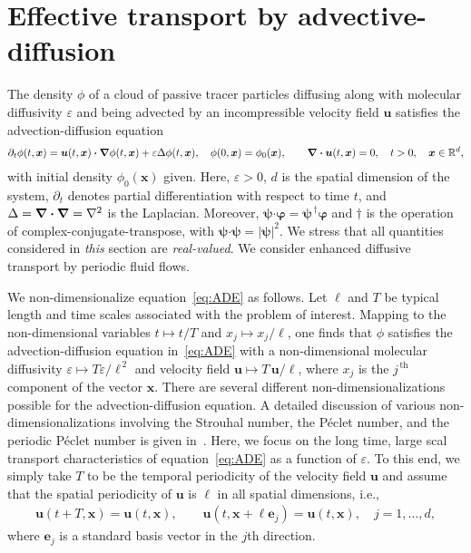 \documentclass[leqno,onefignum,onetabnum]{siamltex1213}
\newcommand\bnabla{\mbox{\boldmath${\nabla}$}}
\providecommand\bcdot{\boldsymbol{\cdot}}
\newcommand{\vecx}{\boldsymbol{x}}
\newcommand{\vecu}{\boldsymbol{u}}
\newcommand{\vece}{\boldsymbol{e}}
\newcommand{\vecpsi}{\boldsymbol{\psi}}
\newcommand{\vecvarphi}{\boldsymbol{\varphi}}
\begin{document}
\section{Effective transport by
  advective-diffusion} \label{sec:Eff_Trans}    
%
The density $\phi$ of a cloud of passive tracer particles diffusing along
with molecular diffusivity $\varepsilon$ and being advected by an incompressible
velocity field $\vecu$ satisfies the advection-diffusion equation
%
\begin{align}\label{eq:ADE}
  \partial_t\phi(t,\vecx)
    =\vecu (t,\vecx)\bcdot\bnabla \phi(t,\vecx)+\varepsilon\Delta \phi(t,\vecx),
  \quad
  \phi(0,\vecx)=\phi_0(\vecx),
  \qquad
  \bnabla \bcdot\vecu(t,\vecx) =0,
  \quad
  t>0,
  \quad
  \vecx\in\mathbb{R}^d,
\end{align}
%
with initial density $\phi_0(\vecx)$ given. Here, $\varepsilon>0$, $d$ is the
spatial dimension of the system, 
$\partial_t$ denotes partial differentiation with respect to time $t$, and 
$\Delta=\bnabla\bcdot\bnabla =\nabla^2$ is the Laplacian. Moreover,
$\vecpsi\bcdot\vecvarphi=\vecpsi^{\,\dagger}\vecvarphi$ and $\dagger$ is the operation
of complex-conjugate-transpose, with
$\vecpsi\bcdot\vecpsi=|\vecpsi|^2$. We stress that all quantities 
considered in \emph{this} section are \emph{real-valued}. We
consider enhanced diffusive transport by periodic fluid flows.




 
We non-dimensionalize equation~\eqref{eq:ADE} as follows. Let $\ell$ and
$T$ be typical length and time scales associated with the problem of
interest. Mapping to the non-dimensional variables
$t\mapsto t/T$ and $x_j\mapsto x_j/\ell$,
one finds that $\phi$ satisfies the advection-diffusion equation
in~\eqref{eq:ADE} with a non-dimensional molecular diffusivity 
$\varepsilon\mapsto T\varepsilon/\ell^{\,2}$ and velocity field $\vecu\mapsto T\,\vecu /\ell$,
where $x_j$ is the $j^{\,\text{th}}$ component of the vector
$\vecx$. There are several different non-dimensionalizations possible
for the advection-diffusion equation. A detailed discussion of 
various non-dimensionalizations involving the Strouhal number, the
P\'{e}clet number, and the periodic P\'{e}clet number is given
in~\cite{McLaughlin:Forest:PF:1999:880}.  Here, we focus on the long
time, large scal transport characteristics of equation~\eqref{eq:ADE}
as a function of $\varepsilon$. To this end, we simply take $T$ to be the
temporal periodicity of the velocity field $\vecu$ and assume that the
spatial periodicity of $\vecu$ is $\ell$ in all spatial dimensions, i.e.,
%
\begin{align}\label{eq:Periodic_u}
  \vecu(t+T,\vecx)=\vecu(t,\vecx), \qquad
  \vecu(t,\vecx+\ell\vece_j)=\vecu(t,\vecx), \quad
  j=1,\ldots,d,
\end{align}
%
where $\vece_j$ is a standard basis vector in the $j$th direction. 
\end{document}
